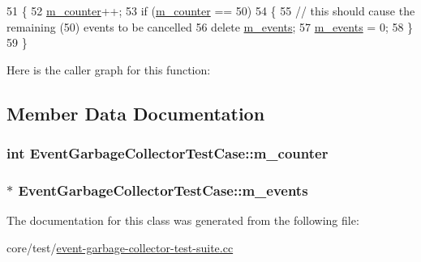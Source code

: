 \begin{DoxyCode}
51 \{
52   \hyperlink{classEventGarbageCollectorTestCase_ae7605a6d3efa06cdf6f6754527e99145}{m\_counter}++;
53   \textcolor{keywordflow}{if} (\hyperlink{classEventGarbageCollectorTestCase_ae7605a6d3efa06cdf6f6754527e99145}{m\_counter} == 50)
54     \{
55       \textcolor{comment}{// this should cause the remaining (50) events to be cancelled}
56       \textcolor{keyword}{delete} \hyperlink{classEventGarbageCollectorTestCase_a6b405f7fe2a4cb6d3a7a37807bf9af76}{m\_events};
57       \hyperlink{classEventGarbageCollectorTestCase_a6b405f7fe2a4cb6d3a7a37807bf9af76}{m\_events} = 0;
58     \}
59 \}
\end{DoxyCode}


Here is the caller graph for this function\+:




\subsection{Member Data Documentation}
\subsubsection[{\texorpdfstring{m\+\_\+counter}{m_counter}}]{\setlength{\rightskip}{0pt plus 5cm}int Event\+Garbage\+Collector\+Test\+Case\+::m\+\_\+counter\hspace{0.3cm}{\ttfamily [private]}}\hypertarget{classEventGarbageCollectorTestCase_ae7605a6d3efa06cdf6f6754527e99145}{}\label{classEventGarbageCollectorTestCase_ae7605a6d3efa06cdf6f6754527e99145}
\subsubsection[{\texorpdfstring{m\+\_\+events}{m_events}}]{$\ast$ Event\+Garbage\+Collector\+Test\+Case\+::m\+\_\+events\hspace{0.3cm}{\ttfamily [private]}}\hypertarget{classEventGarbageCollectorTestCase_a6b405f7fe2a4cb6d3a7a37807bf9af76}{}\label{classEventGarbageCollectorTestCase_a6b405f7fe2a4cb6d3a7a37807bf9af76}


The documentation for this class was generated from the following file\+:\begin{DoxyCompactItemize}
\item 
core/test/\hyperlink{event-garbage-collector-test-suite_8cc}{event-\/garbage-\/collector-\/test-\/suite.\+cc}\end{DoxyCompactItemize}
